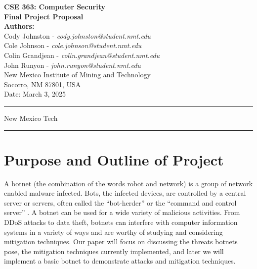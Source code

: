 \documentclass[english,12pt]{article}
\begin{document}
\begin{titlepage}
    \null
    \vspace*{2cm}
    
    \begin{center}
        {\Huge \bfseries CSE 363: Computer Security}\\[1.5cm]
        {\Large \bfseries Final Project Proposal}\\[2cm]
        
        \textbf{Authors:} \\[0.5cm]
        Cody Johnston - \textit{cody.johnston@student.nmt.edu}\\
        Cole Johnson - \textit{cole.johnson@student.nmt.edu}\\
        Colin Grandjean - \textit{colin.grandjean@student.nmt.edu}\\
        John Runyon - \textit{john.runyon@student.nmt.edu}\\
        
        New Mexico Institute of Mining and Technology\\
        Socorro, NM 87801, USA\\[2cm]
        
        {\large Date: March 3, 2025}
    \end{center}
    
    \vfill
    \hrule
    \smallskip
    \centerline{\sc New Mexico Tech}
    \smallskip
    \hrule
\end{titlepage}
\frenchspacing
\pagebreak
\section*{Purpose and Outline of Project}
A botnet (the combination of the words robot and network) is a group of network
enabled malware infected. Bots, the infected devices, are controlled by a central
server or servers, often called the “bot-herder” or the “command and control server”
\cite{Heron:2007}.
A botnet can be used for a wide variety of malicious activities. From DDoS attacks to data
theft, botnets can interfere with computer information systems in a variety of ways
and are worthy of studying and considering mitigation techniques. Our paper will focus
on discussing the threats botnets pose, the mitigation techniques currently implemented,
and later we will implement a basic botnet to demonstrate attacks and mitigation
techniques.
\end{document}
